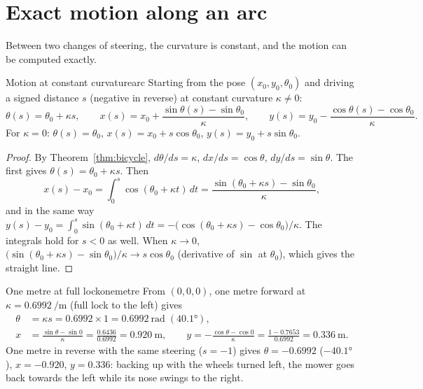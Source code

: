 \section{Exact motion along an arc}

Between two changes of steering, the curvature is constant, and the motion
can be computed exactly.

\begin{proposition}{Motion at constant curvature}{arc}
  Starting from the pose $(x_0, y_0, \theta_0)$ and driving a signed distance
  $s$ (negative in reverse) at constant curvature $\kappa \neq 0$:
  \[
    \theta(s) = \theta_0 + \kappa s, \qquad
    x(s) = x_0 + \frac{\sin\theta(s) - \sin\theta_0}{\kappa}, \qquad
    y(s) = y_0 - \frac{\cos\theta(s) - \cos\theta_0}{\kappa}.
  \]
  For $\kappa = 0$: $\theta(s) = \theta_0$, $x(s) = x_0 + s\cos\theta_0$,
  $y(s) = y_0 + s\sin\theta_0$.
\end{proposition}

\begin{proof}
  By Theorem~\ref{thm:bicycle}, $d\theta/ds = \kappa$, $dx/ds =
  \cos\theta$, $dy/ds = \sin\theta$. The first gives $\theta(s) = \theta_0 +
  \kappa s$. Then
  \[
    x(s) - x_0 = \int_0^s \cos(\theta_0 + \kappa t)\,dt
    = \frac{\sin(\theta_0 + \kappa s) - \sin\theta_0}{\kappa},
  \]
  and in the same way $y(s) - y_0 = \int_0^s \sin(\theta_0 + \kappa t)\,dt
  = -\bigl(\cos(\theta_0 + \kappa s) - \cos\theta_0\bigr)/\kappa$. The
  integrals hold for $s < 0$ as well. When $\kappa \to 0$,
  $\bigl(\sin(\theta_0 + \kappa s) - \sin\theta_0\bigr)/\kappa \to s\cos
  \theta_0$ (derivative of $\sin$ at $\theta_0$), which gives the straight
  line.
\end{proof}

\begin{example}{One metre at full lock}{onemetre}
  From $(0, 0, 0)$, one metre forward at $\kappa = \SI{0.6992}{\per\metre}$
  (full lock to the left) gives
  \begin{align*}
    \theta &= \kappa s = 0.6992 \times 1 = \SI{0.6992}{\radian}
      \;(40.1°), \\
    x &= \frac{\sin\theta - \sin 0}{\kappa} = \frac{0.6436}{0.6992}
      = \SI{0.920}{\metre}, \qquad
    y = -\frac{\cos\theta - \cos 0}{\kappa} = \frac{1 - 0.7653}{0.6992}
      = \SI{0.336}{\metre}.
  \end{align*}
  One metre in reverse with the same steering ($s = -1$) gives
  $\theta = -0.6992$ ($-40.1°$), $x = -0.920$, $y = 0.336$: backing up with
  the wheels turned left, the mower goes back towards the left while its
  nose swings to the right.
\end{example}

